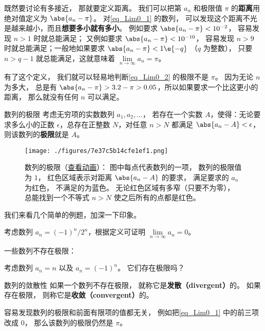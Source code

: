 既然要讨论有多接近， 那就要定义距离。 我们可以把第 $a_n$ 和极限值 $\pi$ 的\textbf{距离}用绝对值定义为 $\abs{a_n - \pi}$。 对\autoref{eq_Lim0_1} 的数列， 可以发现这个距离不光是越来越小，而且\textbf{想要多小就有多小}。 例如要求 $\abs{a_n - \pi} < 10^{-2}$， 容易发现 $n > 1$ 时就总能满足； 又例如要求 $\abs{a_n - \pi} < 10^{-10}$， 容易发现 $n > 9$ 时就总能满足；一般地如果要求 $\abs{a_n - \pi} < 1\e{-q}$ （$q$ 为整数）， 只要 $n > q-1$ 就总能满足，这就意味着 $\lim\limits_{n \to \infty } a_n = \pi$。

有了这个定义， 我们就可以轻易地判断\autoref{eq_Lim0_2} 的极限不是 $\pi$。 因为无论 $n$ 为多大， 总是有 $\abs{a_n - \pi} > 3.2 - \pi > 0.05$，所以如果要求一个比这更小的距离， 那么就没有任何 $n$ 可以满足。

\begin{definition}{数列的极限}\label{def_Lim0_2}
考虑无穷项的实数数列 $a_1, a_2, \dots$， 若存在一个实数 $A$，使得：无论要求多么小的正数 $\epsilon$，总存在正整数 $N$，对任意 $n > N$ 都满足 $\abs{a_n - A} < \epsilon$， 则该数列的\textbf{极限}就是 $A$。
\end{definition}

\begin{figure}[ht]
\centering
\texttt{[image: ./figures/7e37c5b14cfe1ef1.png]}
\caption{数列的极限（\href{https://wuli.wiki/apps/Lim0.html}{查看动画}）： 图中每点代表数列的一项， 数列的极限值为 $1$， 红色区域表示对距离 $\abs{a_n - A}$ 的要求， 满足要求的 $a_n$ 为红色， 不满足的为蓝色。 无论红色区域有多窄（只要不为零）， 总能找到一个不等式 $n > N$ 使之后所有的点都是红色。} \label{fig_Lim0_1}
\end{figure}

我们来看几个简单的例题，加深一下印象。

\begin{example}{}
考虑数列 $a_n= {(-1)^n}/{2^n}$，根据定义可证明 $\lim\limits_{n\to\infty}a_n=0$。
\end{example}

一些数列不存在极限：
\begin{example}{}\label{ex_Lim0_10}
考虑数列 $a_n = n$ 以及 $a_n=(-1)^n$。 它们存在极限吗？
\end{example}

\begin{definition}{数列的敛散性}\label{def_Lim0_4}
如果一个数列不存在极限， 就称它是\textbf{发散（divergent）}的。 如果存在极限， 则称它是\textbf{收敛（convergent）}的。
\end{definition}

\begin{example}{}
容易发现数列的极限和前面有限项的值都无关， 例如把\autoref{eq_Lim0_1} 中的前三项改成 $0$， 那么该数列的极限仍然是 $\pi$。
\end{example}

